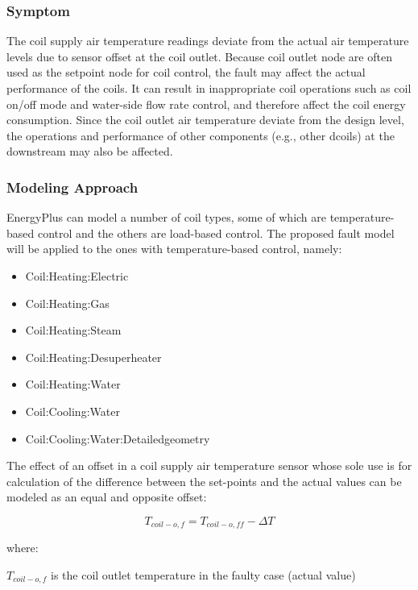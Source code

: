 \subsubsection{Symptom}

The coil supply air temperature readings deviate from the actual air temperature levels due to sensor offset at the coil outlet. Because coil outlet node are often used as the setpoint node for coil control, the fault may affect the actual performance of the coils. It can result in inappropriate coil operations such as coil on/off mode and water-side flow rate control, and therefore affect the coil energy consumption. Since the coil outlet air temperature deviate from the design level, the operations and performance of other components (e.g., other dcoils) at the downstream may also be affected.

\subsubsection{Modeling Approach}

EnergyPlus can model a number of coil types, some of which are temperature-based control and the others are load-based control. The proposed fault model will be applied to the ones with temperature-based control, namely:

\begin{itemize}
\tightlist
\item
  Coil:Heating:Electric
\item
  Coil:Heating:Gas
\item
  Coil:Heating:Steam
\item
  Coil:Heating:Desuperheater
\item
  Coil:Heating:Water
\item
  Coil:Cooling:Water
\item
  Coil:Cooling:Water:Detailedgeometry
\end{itemize}

The effect of an offset in a coil supply air temperature sensor whose sole use is for calculation of the difference between the set-points and the actual values can be modeled as an equal and opposite offset:

\begin{equation}
T_{coil-o,f} = T_{coil-o,ff} - \Delta T
\end{equation}

where:

\(T_{coil-o,f}\) is the coil outlet temperature in the faulty case (actual value)


